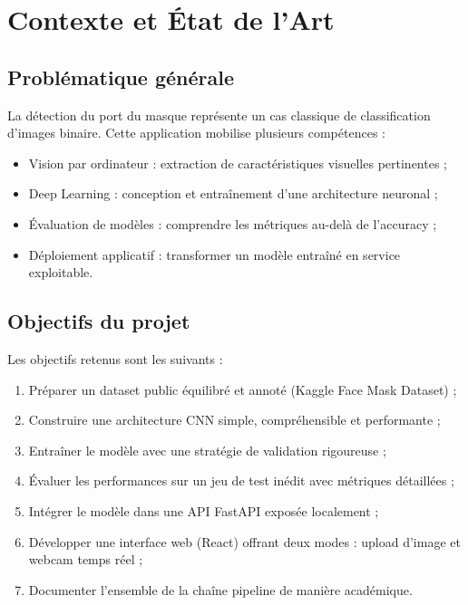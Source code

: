 \documentclass[11pt,a4paper]{article}
\begin{document}
\newpage
\section{Contexte et État de l'Art}

\subsection{Problématique générale}

La détection du port du masque représente un cas classique de classification d'images binaire. Cette application mobilise plusieurs compétences :
\begin{itemize}
    \item Vision par ordinateur : extraction de caractéristiques visuelles pertinentes ;
    \item Deep Learning : conception et entraînement d'une architecture neuronal ;
    \item Évaluation de modèles : comprendre les métriques au-delà de l'accuracy ;
    \item Déploiement applicatif : transformer un modèle entraîné en service exploitable.
\end{itemize}

\subsection{Objectifs du projet}

Les objectifs retenus sont les suivants :
\begin{enumerate}
    \item Préparer un dataset public équilibré et annoté (Kaggle Face Mask Dataset) ;
    \item Construire une architecture CNN simple, compréhensible et performante ;
    \item Entraîner le modèle avec une stratégie de validation rigoureuse ;
    \item Évaluer les performances sur un jeu de test inédit avec métriques détaillées ;
    \item Intégrer le modèle dans une API FastAPI exposée localement ;
    \item Développer une interface web (React) offrant deux modes : upload d'image et webcam temps réel ;
    \item Documenter l'ensemble de la chaîne pipeline de manière académique.
\end{enumerate}
\end{document}
